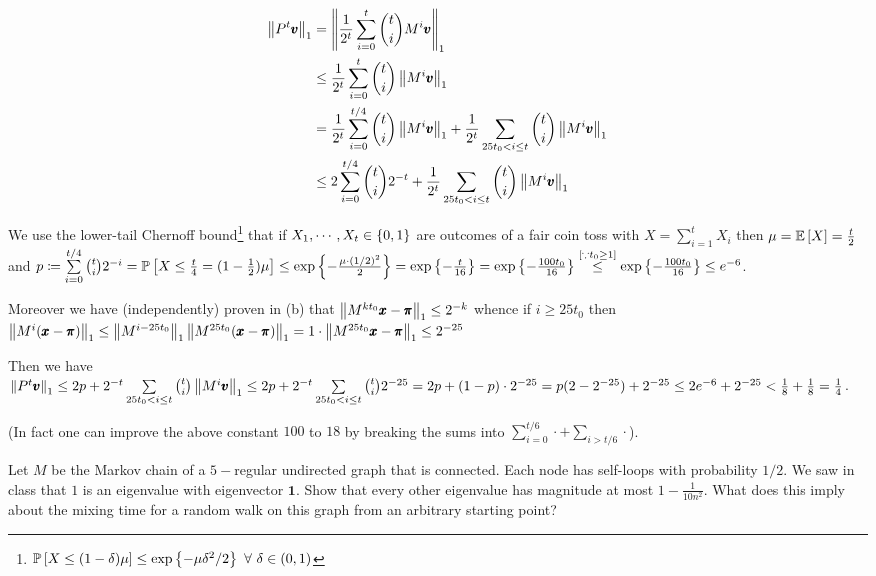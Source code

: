 \begin{enumerate}[leftmargin=*, label=(\alph*)]
\begin{align*}
\left\lVert P^{t}\pmb v \right\rVert_{1} &= \left\lVert \frac{1}{2^{t}}\sum_{i=0}^{t} {t \choose i} M^{i}\pmb v \right\rVert_{1}\\
&\le\frac{1}{2^{t}} \sum_{i=0}^{t}{t \choose i} \left\lVert M^{i}\pmb v \right\rVert_{1}\\
&= \frac{1}{2^{t}}\sum_{i=0}^{t/4}{t \choose i} \left\lVert M^{i}\pmb v \right\rVert_{1} + \frac{1}{2^{t}}\sum_{25t_{0}<i\le t}{t \choose i} \left\lVert M^{i}\pmb v \right\rVert_{1}\\
&\le 2 \sum_{i=0}^{t/4}{t \choose i}2^{-t} + \frac{1}{2^{t}}\sum_{25t_{0}<i\le t}{t \choose i} \left\lVert M^{i}\pmb v \right\rVert_{1}
\end{align*}

We use the lower-tail Chernoff bound\footnote{$\mathbb P\left[ X\le (1-\delta)\mu \right] \le \exp\left\{-\mu\delta^{2}/2\right\}~\forall~ \delta\in(0,1)$} that if $X_{1},\cdots,X_{t}\in \left\{0,1\right\}$ are outcomes of a fair coin toss with $X=\sum_{i=1}^{t}X_{i}$ then $\mu=\mathbb E\left[ X \right] = \frac t2$ and $p\coloneqq \sum\limits_{i=0}^{t/4}{t\choose i}2^{-i} = \mathbb P\left[ X\le \frac{t}{4} = (1-\frac12)\mu \right] \le \exp\left\{-\frac{\mu \cdot (1/2)^{2}}{2}\right\} = \exp\left\{-\frac{t}{16}\right\} = \exp\left\{-\frac{100t_{0}}{16}\right\} \stackrel{[\because t_{0}\ge 1]}{\le} \exp\left\{-\frac{100t_{0}}{16}\right\} \le e^{-6}$.

Moreover we have (independently) proven in (b) that $\left\lVert M^{kt_{0}}\pmb x-\pmb \pi \right\rVert_{1} \le 2^{-k}$ whence if $i\ge 25t_{0}$ then $\left\lVert M^{i}(\pmb x-\pmb \pi) \right\rVert_{1} \le \left\lVert M^{i-25t_{0}} \right\rVert_{1}\left\lVert M^{25t_{0}}(\pmb x-\pmb \pi) \right\rVert_{1} = 1\cdot \left\lVert M^{25t_{0}}\pmb x-\pmb \pi \right\rVert_{1} \le 2^{-25}$

Then we have $\left\lVert P^{t}\pmb v \right\rVert_{1} \le 2p +2^{-t}\sum\limits_{25t_{0}<i\le t}{t \choose i} \left\lVert M^{i}\pmb v \right\rVert_{1} \le 2p +2^{-t}\sum\limits_{25t_{0}<i\le t}{t \choose i} 2^{-25} = 2p+(1-p)\cdot 2^{-25} = p(2-2^{-25}) + 2^{-25} \le 2e^{-6} + 2^{-25} < \frac18 + \frac18 = \frac14$.

(In fact one can improve the above constant $100$ to $18$ by breaking the sums into $\sum\limits_{i=0}^{t/6}\cdot + \sum\limits_{i>t/6}\cdot$).
\end{enumerate}




\newpage
\pb
Let $M$ be the Markov chain of a $5-$regular undirected graph that is connected. Each node has self-loops with probability $1/2$. We saw in class that $1$ is an
eigenvalue with eigenvector $\pmb 1$. Show that every other eigenvalue has magnitude at most $1-\frac{1}{10n^{2}}$. What does this imply about the
mixing time for a random walk on this graph from an arbitrary starting point?


